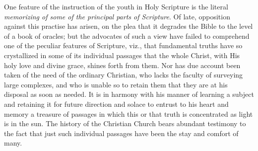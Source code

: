 One feature of the instruction of the youth in Holy Scripture is the literal \emph{memorizing of some of the principal parts of Scripture}. Of late, opposition against this practise has arisen, on the plea that it degrades the Bible to the level of a book of oracles; but the advocates of such a view have failed to comprehend one of the peculiar features of Scripture, viz., that fundamental truths have so crystallized in some of its individual passages that the whole Christ, with His holy love and divine grace, shines forth from them. Nor has due account been taken of the need of the ordinary Christian, who lacks the faculty of surveying large complexes, and who is unable so to retain them that they are at his disposal as soon as needed. It is in harmony with his manner of learning a subject and retaining it for future direction and solace to entrust to his heart and memory a treasure of passages in which this or that truth is concentrated as light is in the sun. The history of the Christian Church bears abundant testimony to the fact that just such individual passages have been the stay and comfort of many.


